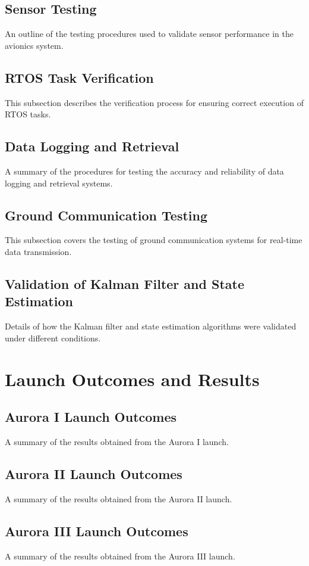 \subsection{Sensor Testing}
An outline of the testing procedures used to validate sensor performance in the avionics system.

\subsection{RTOS Task Verification}
This subsection describes the verification process for ensuring correct execution of RTOS tasks.

\subsection{Data Logging and Retrieval}
A summary of the procedures for testing the accuracy and reliability of data logging and retrieval systems.

\subsection{Ground Communication Testing}
This subsection covers the testing of ground communication systems for real-time data transmission.

\subsection{Validation of Kalman Filter and State Estimation}
Details of how the Kalman filter and state estimation algorithms were validated under different conditions.

\section{Launch Outcomes and Results}
\subsection{Aurora I Launch Outcomes}
A summary of the results obtained from the Aurora I launch.

\subsection{Aurora II Launch Outcomes}
A summary of the results obtained from the Aurora II launch.

\subsection{Aurora III Launch Outcomes}
A summary of the results obtained from the Aurora III launch.

